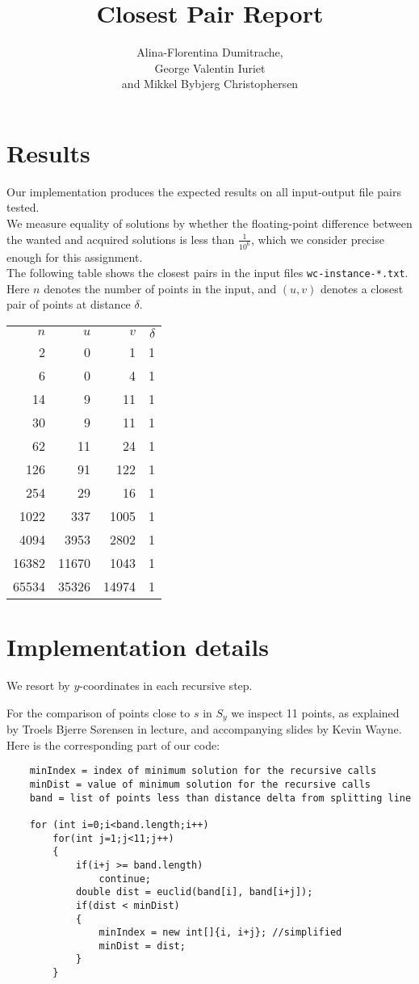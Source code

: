 \documentclass{article}
\title{Closest Pair Report}
\author{Alina-Florentina Dumitrache, \\George Valentin Iuriet \\and Mikkel Bybjerg Christophersen}
\begin{document}
  \maketitle

  \section{Results}

  Our implementation produces the expected results on all input-output file pairs tested.\\
  We measure equality of solutions by whether the floating-point difference between the wanted and acquired solutions is less than $\frac{1}{10^6}$, which we consider precise enough for this assignment. \\

  The following table shows the closest pairs in the input files {\tt wc-instance-*.txt}.
  Here $n$ denotes the number of points in the input,
  and $(u,v)$ denotes a closest pair of points at distance $\delta$.

  \bigskip\noindent
  \begin{tabular}{rrrr}
    $n$ & $u$ & $v$ & $\delta$ \\
    2 & 0 & 1 & 1 \\
    6 & 0 & 4 & 1 \\
    14 & 9 & 11 & 1 \\
    30 & 9 & 11 & 1 \\
    62 & 11 & 24 & 1 \\
    126 & 91 & 122 & 1 \\
    254 & 29 & 16 & 1 \\
    1022 & 337 & 1005 & 1 \\
    4094 & 3953 & 2802 & 1 \\
    16382 & 11670 & 1043 & 1 \\
    65534 & 35326 & 14974 & 1 \\
  \end{tabular}


  \section{Implementation details}

  We resort by $y$-coordinates in each recursive step.

  For the comparison of points close to $s$ in $S_y$ we inspect 11 points,
  as explained by Troels Bjerre Sørensen in lecture, and accompanying slides by Kevin Wayne.\\	
  Here is the corresponding part of our code:
  \begin{verbatim}
    minIndex = index of minimum solution for the recursive calls
    minDist = value of minimum solution for the recursive calls
    band = list of points less than distance delta from splitting line
    
    for (int i=0;i<band.length;i++)
        for(int j=1;j<11;j++)
        {
            if(i+j >= band.length)
                continue;
            double dist = euclid(band[i], band[i+j]);
            if(dist < minDist)
            {
                minIndex = new int[]{i, i+j}; //simplified
                minDist = dist;
            }
        }
  \end{verbatim}
\end{document}
